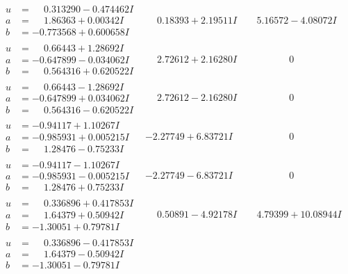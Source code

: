 \documentclass[1p]{elsarticle_modified}
\theoremstyle{definition}
\begin{document}
$$\begin{array}{c|c|c}
\begin{aligned}
u &= \phantom{-}0.313290 - 0.474462 I \\
a &= \phantom{-}1.86363 + 0.00342 I \\
b &= -0.773568 + 0.600658 I\end{aligned}
 & \phantom{-}0.18393 + 2.19511 I & \phantom{-}5.16572 - 4.08072 I \\ \hline\begin{aligned}
u &= \phantom{-}0.66443 + 1.28692 I \\
a &= -0.647899 - 0.034062 I \\
b &= \phantom{-}0.564316 + 0.620522 I\end{aligned}
 & \phantom{-}2.72612 + 2.16280 I & \phantom{-0.000000 } 0 \\ \hline\begin{aligned}
u &= \phantom{-}0.66443 - 1.28692 I \\
a &= -0.647899 + 0.034062 I \\
b &= \phantom{-}0.564316 - 0.620522 I\end{aligned}
 & \phantom{-}2.72612 - 2.16280 I & \phantom{-0.000000 } 0 \\ \hline\begin{aligned}
u &= -0.94117 + 1.10267 I \\
a &= -0.985931 + 0.005215 I \\
b &= \phantom{-}1.28476 - 0.75233 I\end{aligned}
 & -2.27749 + 6.83721 I & \phantom{-0.000000 } 0 \\ \hline\begin{aligned}
u &= -0.94117 - 1.10267 I \\
a &= -0.985931 - 0.005215 I \\
b &= \phantom{-}1.28476 + 0.75233 I\end{aligned}
 & -2.27749 - 6.83721 I & \phantom{-0.000000 } 0 \\ \hline\begin{aligned}
u &= \phantom{-}0.336896 + 0.417853 I \\
a &= \phantom{-}1.64379 + 0.50942 I \\
b &= -1.30051 + 0.79781 I\end{aligned}
 & \phantom{-}0.50891 - 4.92178 I & \phantom{-}4.79399 + 10.08944 I \\ \hline\begin{aligned}
u &= \phantom{-}0.336896 - 0.417853 I \\
a &= \phantom{-}1.64379 - 0.50942 I \\
b &= -1.30051 - 0.79781 I\end{aligned}

\end{array}$$
\end{document}
